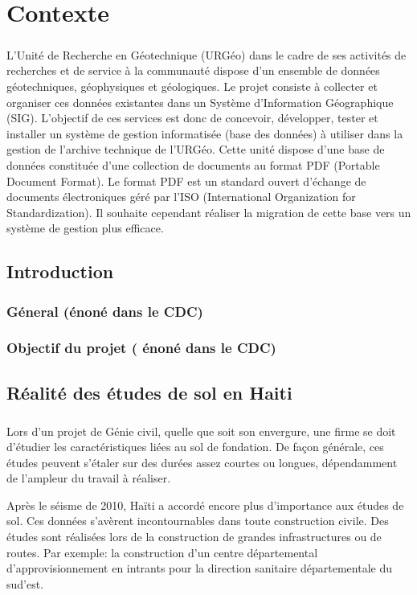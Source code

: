 \chapter{Contexte}
\paragraph{}
L’Unité de Recherche en Géotechnique (URGéo) dans le cadre de ses activités de recherches et de service à
la communauté dispose d’un ensemble de données géotechniques, géophysiques et géologiques. Le projet
consiste à collecter et organiser ces données existantes dans un Système d’Information Géographique (SIG).
L’objectif de ces services est donc de concevoir, développer, tester et installer un système de gestion
informatisée (base des données) à utiliser dans la gestion de l’archive technique de l’URGéo. Cette unité
dispose d'une base de données constituée d’une collection de documents au format PDF (Portable Document
Format). Le format PDF est un standard ouvert d'échange de documents électroniques géré par l’ISO
(International Organization for Standardization). Il souhaite cependant réaliser la migration de cette base vers
un système de gestion plus efficace.
    \section{Introduction}
        \subsection{Géneral (énoné dans le CDC)}
        \lipsum[1]
        \subsection{Objectif du projet ( énoné dans le CDC)}
        \lipsum[1]
    \section{Réalité des études de sol en Haiti}
    \paragraph{}
    Lors d'un projet de Génie civil, quelle que soit son envergure, une firme se doit d'étudier 
    les caractéristiques liées au sol de fondation. De façon générale, ces études peuvent s'étaler 
    sur des durées assez courtes ou longues, dépendamment de l'ampleur du travail à réaliser.
    \par
    Après le séisme de 2010, Haïti a accordé encore plus d'importance aux études de sol. Ces données s'avèrent 
    incontournables dans toute construction civile. Des études sont réalisées lors de la construction de grandes infrastructures ou de routes.
    Par exemple: la construction d'un centre départemental d'approvisionnement en intrants pour la direction sanitaire 
    départementale du sud'est.
    \cite{realisation_geotechsol}
    
